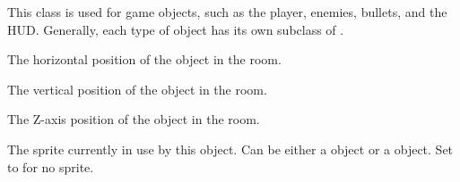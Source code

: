 \documentclass[letterpaper,10pt,english]{sphinxmanual}
\begin{document}
\begin{fulllineitems}
\label{dsp:sge.dsp.Object}
This class is used for game objects, such as the player, enemies,
bullets, and the HUD.  Generally, each type of object has its own
subclass of {\hyperref[dsp:sge.dsp.Object]{\emph{}}}.

\begin{fulllineitems}
\label{dsp:sge.dsp.Object.x}
The horizontal position of the object in the room.

\end{fulllineitems}


\begin{fulllineitems}
\label{dsp:sge.dsp.Object.y}
The vertical position of the object in the room.

\end{fulllineitems}


\begin{fulllineitems}
\label{dsp:sge.dsp.Object.z}
The Z-axis position of the object in the room.

\end{fulllineitems}


\begin{fulllineitems}
\label{dsp:sge.dsp.Object.sprite}
The sprite currently in use by this object.  Can be either a
{\hyperref[gfx:sge.gfx.Sprite]{\emph{}}} object or a 
object.  Set to  for no sprite.


\end{fulllineitems}
\end{fulllineitems}
\end{document}

